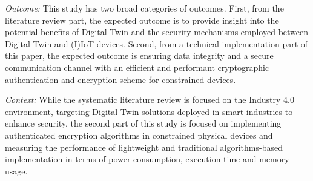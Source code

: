 \textit{Outcome:} This study has two broad categories of outcomes. First, from the literature review part, the expected outcome is to provide insight into the potential benefits of Digital Twin and the security mechanisms employed between Digital Twin and (I)IoT devices. Second, from a technical implementation part of this paper, the expected outcome is ensuring data integrity and a secure communication channel with an efficient and performant cryptographic authentication and encryption scheme for constrained devices.

\textit{Context:} While the systematic literature review is focused on the Industry 4.0 environment, targeting Digital Twin solutions deployed in smart industries to enhance security, the second part of this study is focused on implementing authenticated encryption algorithms in constrained physical devices and measuring the performance of lightweight and traditional algorithms-based implementation in terms of power consumption, execution time and memory usage. 